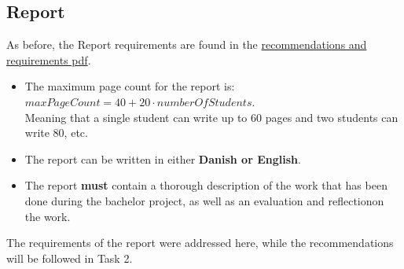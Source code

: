 \documentclass{scrartcl}
\begin{document}
\iffalse
\begin{enumerate}
	\item Strive to include elements from courses passed
	\item Group size is maximum 4 students.
\end{enumerate}
\fi

\subsection{Report}
\label{sec:report}
As before, the Report requirements are found in the \href{https://datsoftlyngby.github.io/soft2020fall/resources/bbe51cf2-bachelorProject.pdf}{recommendations and requirements pdf}.
\begin{itemize}
	\item The maximum page count for the report is:\\$maxPageCount = 40 + 20 \cdot numberOfStudents$.\\Meaning that a single student can write up to 60 pages and two students can write 80, etc.
	\item The report can be written in either \textbf{Danish or English}.
	\item The report \textbf{must} contain a thorough description of the work that has been done during the bachelor project, as well as an evaluation and reflectionon the work.
\end{itemize}
The requirements of the report were addressed here, while the recommendations will be followed in Task 2.
\end{document}
